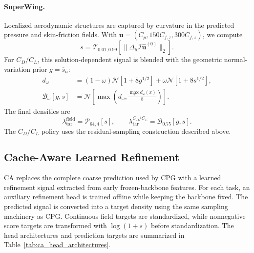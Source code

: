 \documentclass{article}
\begin{document}
\paragraph{SuperWing.}
Localized aerodynamic structures are captured by curvature in the predicted
pressure and skin-friction fields. With
$\mathbf u=(C_p,150C_{f,\tau},300C_{f,z})$, we compute
\[
    s
    =\mathcal{T}_{0.01,0.99}
       \left[
       \|\Delta_5\mathcal{I}
       \widehat{\mathbf u}^{(0)}\|_2
       \right].
\]
For $C_D/C_L$, this solution-dependent signal is blended with the geometric
normal-variation prior $g=\overline{s}_n$:
\begin{equation}
    \begin{aligned}
    d_\omega
       &=(1-\omega)\mathcal{N}[1+8g^{1/2}]
        +\omega\mathcal{N}[1+8s^{1/2}],\\
    \mathcal{B}_\omega[g,s]
       &=\mathcal{N}\!\left[
          \max\!\left(
          d_\omega,
          \frac{\max_x d_\omega(x)}{8}
          \right)
          \right].
    \end{aligned}
    \label{eq:app_density_wing_blend}
\end{equation}
The final densities are
\begin{equation}
    \lambda_{\mathrm{tar}}^{\mathrm{field}}
    =\mathcal{P}_{64,4}[s],
    \qquad
    \lambda_{\mathrm{tar}}^{C_D/C_L}
    =\mathcal{B}_{0.75}[g,s].
    \label{eq:app_cpg_superwing_density}
\end{equation}
The $C_D/C_L$ policy uses the residual-sampling construction described above.


\subsection{Cache-Aware Learned Refinement}
\label{app:ca_density_design}

CA replaces the complete coarse prediction used by CPG with a learned
refinement signal extracted from early frozen-backbone features. For each task,
an auxiliary refinement head is trained offline while keeping the backbone
fixed. The predicted signal is converted into a target density using the same
sampling machinery as CPG. Continuous field targets are standardized, while
nonnegative score targets are transformed with $\log(1+s)$ before
standardization. The head architectures and prediction targets are summarized
in Table~\ref{tab:ca_head_architectures}.
\end{document}
